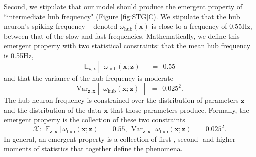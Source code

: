 \documentclass[11pt]{article}
\begin{document}
Second, we stipulate that our model should produce the emergent property of ``intermediate hub frequency" (Figure \ref{fig:STG}C).
We stipulate that the hub neuron's spiking frequency -- denoted $\omega_{\text{hub}}(\mathbf{x})$ is close to a frequency of 0.55Hz, between that of the slow and fast frequencies.
Mathematically, we define this emergent property with two statistical constraints: that the mean hub frequency is 0.55Hz,
\begin{equation}\label{eq:EP_STG1}
 \mathbb{E}_{\mathbf{z},\mathbf{x}}\begin{bmatrix} \omega_{\text{hub}}(\mathbf{x}; \mathbf{z}) \end{bmatrix}  ~~=~~  0.55 
\end{equation}
and that the variance of the hub frequency is moderate
\begin{equation}\label{eq:EP_STG2}
\text{Var}_{\mathbf{z},\mathbf{x}}\begin{bmatrix} \omega_{\text{hub}}(\mathbf{x}; \mathbf{z}) \end{bmatrix}  ~~=~~   0.025^2.
\end{equation}
The hub neuron frequency is constrained over the distribution of parameters $\mathbf{z}$  and the distribution of the data $\mathbf{x}$ that those parameters produce.
Formally, the emergent property is the collection of these two constraints
\begin{equation}\label{eq:EP_STG}
\mathcal{X}:~~ \mathbb{E}_{\mathbf{z},\mathbf{x}}\left[\omega_{\text{hub}}(\mathbf{x}; \mathbf{z})\right] = 0.55,~~\text{Var}_{\mathbf{z},\mathbf{x}}\left[\omega_{\text{hub}}(\mathbf{x}; \mathbf{z})\right] =0.025^2.
\end{equation}
In general, an emergent property is a collection of first-, second- and higher moments of  statistics that together define the phenomena.
\end{document}
